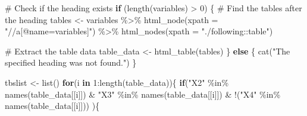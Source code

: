\documentclass[
  norsk,
  letterpaper,
  DIV=11,
  numbers=noendperiod]{scrreprt}
\newenvironment{Shaded}{\begin{snugshade}}{\end{snugshade}}
\newcommand{\AttributeTok}[1]{\textcolor[rgb]{0.40,0.45,0.13}{#1}}
\newcommand{\CommentTok}[1]{\textcolor[rgb]{0.37,0.37,0.37}{#1}}
\newcommand{\ControlFlowTok}[1]{\textcolor[rgb]{0.00,0.23,0.31}{\textbf{#1}}}
\newcommand{\DecValTok}[1]{\textcolor[rgb]{0.68,0.00,0.00}{#1}}
\newcommand{\FunctionTok}[1]{\textcolor[rgb]{0.28,0.35,0.67}{#1}}
\newcommand{\NormalTok}[1]{\textcolor[rgb]{0.00,0.23,0.31}{#1}}
\newcommand{\OtherTok}[1]{\textcolor[rgb]{0.00,0.23,0.31}{#1}}
\newcommand{\SpecialCharTok}[1]{\textcolor[rgb]{0.37,0.37,0.37}{#1}}
\newcommand{\StringTok}[1]{\textcolor[rgb]{0.13,0.47,0.30}{#1}}
\theoremstyle{definition}
\theoremstyle{remark}
\begin{document}
\begin{Shaded}
\begin{Highlighting}[]
\CommentTok{\# Check if the heading exists}
\ControlFlowTok{if}\NormalTok{ (}\FunctionTok{length}\NormalTok{(variables) }\SpecialCharTok{\textgreater{}} \DecValTok{0}\NormalTok{) \{}
  \CommentTok{\# Find the tables after the heading}
\NormalTok{  tables }\OtherTok{\textless{}{-}}\NormalTok{ variables }\SpecialCharTok{\%\textgreater{}\%} 
    \FunctionTok{html\_node}\NormalTok{(}\AttributeTok{xpath =} \StringTok{"//a[@name=\textquotesingle{}variables\textquotesingle{}]"}\NormalTok{) }\SpecialCharTok{\%\textgreater{}\%} 
    \FunctionTok{html\_nodes}\NormalTok{(}\AttributeTok{xpath =} \StringTok{"./following::table"}\NormalTok{)}
  
  \CommentTok{\# Extract the table data}
\NormalTok{  table\_data }\OtherTok{\textless{}{-}} \FunctionTok{html\_table}\NormalTok{(tables)}
\NormalTok{  \} }\ControlFlowTok{else}\NormalTok{ \{}
  \FunctionTok{cat}\NormalTok{(}\StringTok{"The specified heading was not found."}\NormalTok{)}
\NormalTok{\}}


\NormalTok{tbslist }\OtherTok{\textless{}{-}} \FunctionTok{list}\NormalTok{()}
\ControlFlowTok{for}\NormalTok{(i }\ControlFlowTok{in} \DecValTok{1}\SpecialCharTok{:}\FunctionTok{length}\NormalTok{(table\_data))\{ }
  \ControlFlowTok{if}\NormalTok{(}\StringTok{"X2"} \SpecialCharTok{\%in\%} \FunctionTok{names}\NormalTok{(table\_data[[i]]) }\SpecialCharTok{\&} 
     \StringTok{"X3"} \SpecialCharTok{\%in\%} \FunctionTok{names}\NormalTok{(table\_data[[i]]) }\SpecialCharTok{\&} 
     \SpecialCharTok{!}\NormalTok{(}\StringTok{"X4"} \SpecialCharTok{\%in\%} \FunctionTok{names}\NormalTok{(table\_data[[i]])) )\{}
    

\end{Highlighting}
\end{Shaded}
\end{document}
